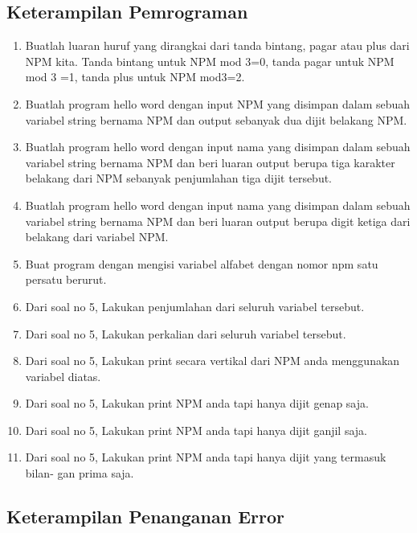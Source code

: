 \subsection{Keterampilan Pemrograman}
\begin{enumerate}
    \item Buatlah luaran huruf yang dirangkai dari tanda bintang, pagar atau plus dari
    NPM kita. Tanda bintang untuk NPM mod 3=0, tanda pagar untuk NPM mod
    3 =1, tanda plus untuk NPM mod3=2.
    

    \item Buatlah program hello word dengan input NPM yang disimpan dalam sebuah
    variabel string bernama NPM dan output sebanyak dua dijit belakang NPM.
    
    
    \item Buatlah program hello word dengan input nama yang disimpan dalam sebuah
    variabel string bernama NPM dan beri luaran output berupa tiga karakter
    belakang dari NPM sebanyak penjumlahan tiga dijit tersebut.
    

    \item Buatlah program hello word dengan input nama yang disimpan dalam sebuah
    variabel string bernama NPM dan beri luaran output berupa digit ketiga dari
    belakang dari variabel NPM.
    

    \item Buat program dengan mengisi variabel alfabet
    dengan nomor npm satu persatu berurut.
    

    \item Dari soal no 5, Lakukan penjumlahan dari seluruh variabel tersebut.
    

    \item Dari soal no 5, Lakukan perkalian dari seluruh variabel tersebut.
    

    \item Dari soal no 5, Lakukan print secara vertikal dari NPM anda menggunakan
    variabel diatas.
    

    \item Dari soal no 5, Lakukan print NPM anda tapi hanya dijit genap saja.
    

    \item Dari soal no 5, Lakukan print NPM anda tapi hanya dijit ganjil saja.
    

    \item Dari soal no 5, Lakukan print NPM anda tapi hanya dijit yang termasuk bilan-
    gan prima saja.
    

\end{enumerate}
\subsection{Keterampilan Penanganan Error}
    
